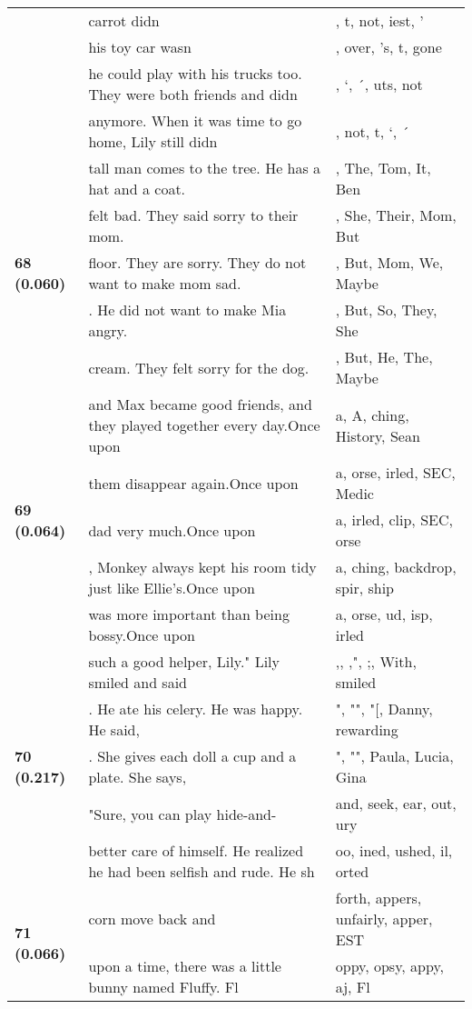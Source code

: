 \documentclass{article}
\begin{document}
\begin{adjustbox}{max width=\textwidth}
\begin{tabular}{p{} p{} p{}}
 & carrot didn & , t,  not, iest, ' \\
 & his toy car wasn & ,  over, 's, t,  gone \\
 & he could play with his trucks too. They were both friends and didn & , `, ´, uts,  not \\
 & anymore. When it was time to go home, Lily still didn & ,  not, t, `, ´ \\
\midrule
\multirow{5}{*}{\textbf{68 (0.060)}} & tall man comes to the tree. He has a hat and a coat. & ,  The,  Tom,  It,  Ben \\
 & felt bad. They said sorry to their mom. & ,  She,  Their,  Mom,  But \\
 & floor. They are sorry. They do not want to make mom sad. & ,  But,  Mom,  We,  Maybe \\
 & . He did not want to make Mia angry. & ,  But,  So,  They,  She \\
 & cream. They felt sorry for the dog. & ,  But,  He,  The,  Maybe \\
\midrule
\multirow{5}{*}{\textbf{69 (0.064)}} & and Max became good friends, and they played together every day.Once upon & a, A, ching, History, Sean \\
 & them disappear again.Once upon & a, orse, irled, SEC, Medic \\
 & dad very much.Once upon & a, irled, clip, SEC, orse \\
 & , Monkey always kept his room tidy just like Ellie's.Once upon & a, ching,  backdrop,  spir, ship \\
 & was more important than being bossy.Once upon & a, orse, ud, isp, irled \\
\midrule
\multirow{5}{*}{\textbf{70 (0.217)}} & such a good helper, Lily." Lily smiled and said & ,, ,", ;,  With,  smiled \\
 & . He ate his celery. He was happy. He said, & ",  "",  "[,  Danny,  rewarding \\
 & . She gives each doll a cup and a plate. She says, & ",  "",  Paula,  Lucia,  Gina \\
 & "Sure, you can play hide-and- & and,  seek, ear, out, ury \\
 & better care of himself. He realized he had been selfish and rude. He sh & oo, ined, ushed, il, orted \\
\midrule
\multirow{5}{*}{\textbf{71 (0.066)}} & corn move back and & forth, appers,  unfairly, apper, EST \\
 & upon a time, there was a little bunny named Fluffy. Fl & oppy, opsy, appy, aj,  Fl \\

\end{tabular}
\end{adjustbox}
\end{document}
